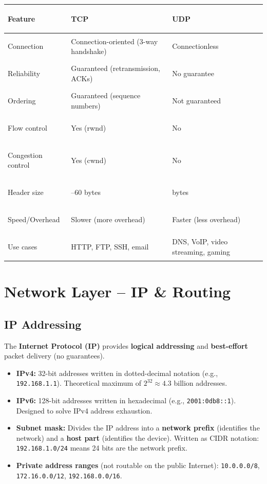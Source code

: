 \documentclass[11pt, letterpaper]{article}
\begin{document}
\noindent
{\renewcommand{\arraystretch}{1.6}
\begin{tabularx}{\textwidth}{>{\bfseries\raggedright\arraybackslash}p{4cm}
                              >{\raggedright\arraybackslash}X
                              >{\raggedright\arraybackslash}X}
\toprule
\rowcolor{tableheadergreen}
\textbf{Feature} & \textbf{TCP} & \textbf{UDP} \\
\midrule
\rowcolor{rowA}  Connection     & Connection-oriented (3-way handshake) & Connectionless \\
\rowcolor{rowBg} Reliability    & Guaranteed (retransmission, ACKs) & No guarantee \\
\rowcolor{rowA}  Ordering       & Guaranteed (sequence numbers) & Not guaranteed \\
\rowcolor{rowBg} Flow control   & Yes (rwnd) & No \\
\rowcolor{rowA}  Congestion control & Yes (cwnd) & No \\
\rowcolor{rowBg} Header size    & 20--60 bytes & 8 bytes \\
\rowcolor{rowA}  Speed/Overhead & Slower (more overhead) & Faster (less overhead) \\
\rowcolor{rowBg} Use cases      & HTTP, FTP, SSH, email & DNS, VoIP, video streaming, gaming \\
\bottomrule
\end{tabularx}}

\section*{Network Layer -- IP \& Routing}

\subsection*{IP Addressing}

The \textbf{Internet Protocol (IP)} provides \textbf{logical addressing} and \textbf{best-effort} packet delivery (no guarantees).

\begin{itemize}[noitemsep]
  \item \textbf{IPv4:} 32-bit addresses written in dotted-decimal notation (e.g., \texttt{192.168.1.1}). Theoretical maximum of $2^{32} \approx 4.3$ billion addresses.
  \item \textbf{IPv6:} 128-bit addresses written in hexadecimal (e.g., \texttt{2001:0db8::1}). Designed to solve IPv4 address exhaustion.
  \item \textbf{Subnet mask:} Divides the IP address into a \textbf{network prefix} (identifies the network) and a \textbf{host part} (identifies the device). Written as CIDR notation: \texttt{192.168.1.0/24} means 24 bits are the network prefix.
  \item \textbf{Private address ranges} (not routable on the public Internet): \texttt{10.0.0.0/8}, \texttt{172.16.0.0/12}, \texttt{192.168.0.0/16}.
\end{itemize}
\end{document}
